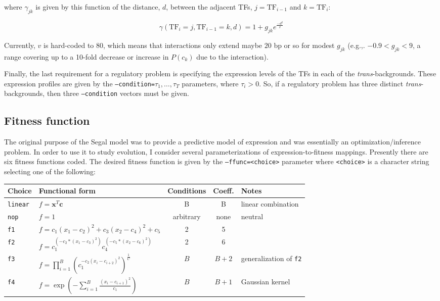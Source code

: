 \documentclass[11pt]{article}
\begin{document}
\noindent where $\gamma_{jk}$ is given by this function of the distance, $d$, between the adjacent TFs, $j = \mathrm{TF}_{i-1}$ and $k = \mathrm{TF}_{i}$:

\begin{displaymath}
\gamma(\mathrm{TF}_{i}=j,\mathrm{TF}_{i-1}=k,d) = 1+g_{jk}e^{\frac{-d^2}{v}}
\end{displaymath}

\noindent Currently, $v$ is hard-coded to $80$, which means that interactions only extend maybe $20$ bp or so for modest $g_{jk}$ (e.g.,. $-0.9 < g_{jk} < 9$, a range covering up to a 10-fold decrease or increase in $P(c_k)$ due to the interaction). 

Finally, the last requirement for a regulatory problem is specifying the expression levels of the TFs in each of the \emph{trans}-backgrounds. These expression profiles are given by the \texttt{--condition=}$\tau_1,\ldots,\tau_T$ parameters, where $\tau_i > 0$. So, if a regulatory problem has three distinct \emph{trans}-backgrounds, then three \texttt{--condition} vectors must be given.

\subsection{Fitness function}

The original purpose of the Segal model was to provide a predictive model of expression and was essentially an optimization/inference problem. In order to use it to study evolution, I consider several parameterizations of expression-to-fitness mappings. Presently there are six fitness functions coded. The desired fitness function is given by the \texttt{--ffunc=<choice>} parameter where \texttt{<choice>} is a character string selecting one of the following:

\begin{tabular}{l|p{6cm}|c|c|p{3.5cm}}
Choice & Functional form & Conditions & Coeff. & Notes \\
\hline
\texttt{linear} & $f = \mathbf{x}^{T} \mathbf{c}$ & B & B & linear combination\\
\texttt{nop} & $f = 1$ & arbitrary & none & neutral\\
\texttt{f1} & $f = c_1 (x_1-c_2)^2 + c_3 (x_2-c_4)^2 + c_5$ & 2 & 5 & \\
\texttt{f2} & $f = c_1^{(-c_2*(x_1-c_3)^2)} c_4^{(-c_5*(x_2-c_6)^2)}$ & 2 & 6 & \\
\texttt{f3} & $f = \prod_{i=1}^{B} (c_1^{-c_2(x_i-c_{i+2})^2})^{\frac{1}{C}}$ & $B$ & $B+2$ & generalization of \texttt{f2} \\
\texttt{f4} & $f = \exp(-\sum_{i=1}^{B}\frac{(x_i-c_{i+1})^2}{c_1})$ & $B$ & $B+1$ & Gaussian kernel \\
\hline
\end{tabular}
\end{document}
